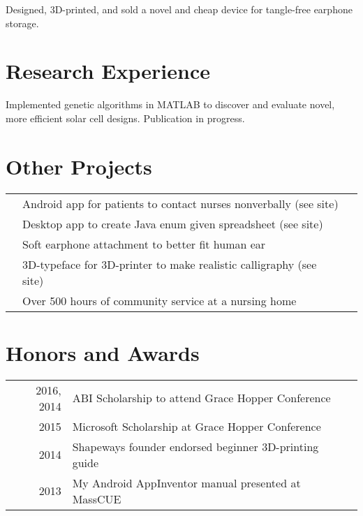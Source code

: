 \documentclass[]{jackie_loven_resume}
\begin{document}
\begin{minipage}[t]{0.66\textwidth}
Designed, 3D-printed, and sold a novel and cheap device for tangle-free earphone storage.
\href{https://youtu.be/2cVlB-0IW54}{}
\sectionsep


\section{Research Experience}

Implemented genetic algorithms in MATLAB to discover and evaluate novel, more efficient solar cell designs. Publication in progress.
\sectionsep


\section{Other Projects} 

\begin{tabular}{rll}
&  Android app for patients to contact nurses nonverbally (see site)\\
&  Desktop app to create Java enum given spreadsheet (see site)\\
&  Soft earphone attachment to better fit human ear\\
&  3D-typeface for 3D-printer to make realistic calligraphy (see site)\\
&  Over 500 hours of community service at a nursing home
\end{tabular}
\sectionsep


\section{Honors and Awards} 
\begin{tabular}{rll}
2016, 2014	   & ABI Scholarship to attend Grace Hopper Conference \\
2015              & Microsoft Scholarship at Grace Hopper Conference \\
2014              & Shapeways founder endorsed beginner 3D-printing guide\\
2013              & My Android AppInventor manual presented at MassCUE 
\end{tabular}
\sectionsep





\end{minipage} 
\end{document}
